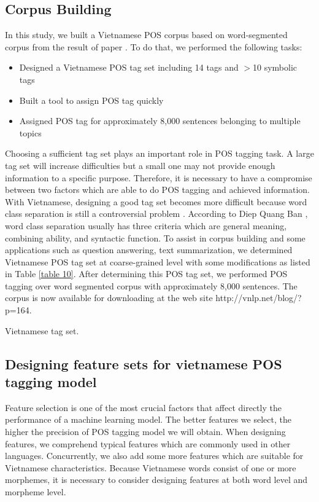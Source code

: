 \documentclass[english]{jnlp_1.4}
\begin{document}
\subsection{Corpus Building}

In this study, we built a Vietnamese POS corpus based on
	word-segmented corpus from the result of paper \cite{CamTu07}. To do that, we performed the following tasks:
	\begin{itemize}
   \item Designed a Vietnamese POS tag set including 14 tags and $>$10 symbolic tags
   \item Built a tool to assign POS tag quickly
   \item Assigned POS tag for approximately 8,000 sentences belonging to multiple topics
   \end{itemize}
	Choosing a sufficient tag set plays an important role in POS tagging task. A large tag set will increase difficulties but a small one
	may not provide enough information to a specific purpose. Therefore, it is necessary to have a compromise between two
	factors which are able to do POS tagging and achieved information. With Vietnamese, designing a good tag
	set becomes more difficult because word class separation is still a controversial problem \cite{BanDQ00} \cite{Hoa04}.
	According to Diep Quang Ban \cite{BanDQ00},
	word class separation usually has three criteria which are general meaning, combining ability, and syntactic function.
	To assist in corpus building and some applications such as question answering, text summarization,
	we determined Vietnamese POS tag set at coarse-grained level with some modifications as listed in Table \ref{table 10}.
	After determining this POS tag set, we performed POS tagging over word segmented corpus with approximately 8,000 sentences. The corpus is now available for
downloading at the web site http://vnlp.net/blog/?p=164.

\begin{table}[b]
\vspace{-1\baselineskip}
\caption{Vietnamese tag set.}
\label{table 10}

\end{table}


\subsection{Designing feature sets for vietnamese POS tagging model}

   Feature selection is one of the most crucial factors that affect directly the
	  performance of a machine learning model. The better features we select, the higher the precision of POS tagging model we will obtain. When designing features, we comprehend typical features which are commonly used in other languages. Concurrently, we also add some more features which are suitable for Vietnamese characteristics. Because Vietnamese words consist of one or more morphemes, it is necessary to consider designing features at both word level and morpheme level.	
\end{document}
